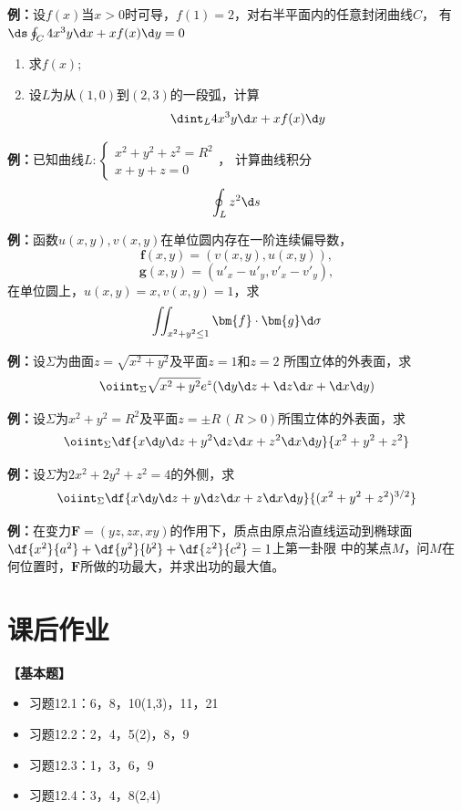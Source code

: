 {\bf 例：}设$f(x)$当$x>0$时可导，$f(1)=2$，对右半平面内的任意封闭曲线$C$，
有$\ds\oint_C4x^3y\d x+xf(x)\d y=0$
\begin{enumerate}[(1)]
  \setlength{\itemindent}{1cm}
  \item 求$f(x)$;
  \item 设$L$为从$(1,0)$到$(2,3)$的一段弧，计算
  $$\dint_L4x^3y\d x+xf(x)\d y$$
\end{enumerate}

{\bf 例：}已知曲线$L:\left\{\begin{array}{l}
	x^2+y^2+z^2=R^2\\ x+y+z=0
\end{array}\right.$，
计算曲线积分
$$\oint_Lz^2\d s$$

{\bf 例：}函数$u(x,y),v(x,y)$在单位圆内存在一阶连续偏导数，
$$\bm{f}(x,y)=(v(x,y),u(x,y)),$$
$$\bm{g}(x,y)=\left(u'_x-u'_y,v'_x-v'_y\right),$$
在单位圆上，$u(x,y)=x,v(x,y)=1$，求
$$\iint_{x^2+y^2\leq 1}\bm{f}\cdot\bm{g}\d\sigma$$

{\bf 例：}设$\Sigma$为曲面$z=\sqrt{x^2+y^2}$及平面$z=1$和$z=2$
所围立体的外表面，求
$$\oiint_{\Sigma}\sqrt{x^2+y^2}e^z(\d y\d z+\d z\d x+\d x\d y)$$

{\bf 例：}设$\Sigma$为$x^2+y^2=R^2$及平面$z=\pm R\,(R>0)$所围立体的外表面，求
$$\oiint_{\Sigma}\df{x\d y\d z+y^2\d z\d x+z^2\d x\d y}{x^2+y^2+z^2}$$

{\bf 例：}设$\Sigma$为$2x^2+2y^2+z^2=4$的外侧，求
$$\oiint_{\Sigma}\df{x\d y\d z+y\d z\d x+z\d x\d y}{(x^2+y^2+z^2)^{3/2}}$$

{\bf 例：}在变力$\bm{F}=(yz,zx,xy)$的作用下，质点由原点沿直线运动到椭球面
$\df{x^2}{a^2}+\df{y^2}{b^2}+\df{z^2}{c^2}=1$上第一卦限
中的某点$M$，问$M$在何位置时，$\bm{F}$所做的功最大，并求出功的最大值。

\newpage

\section*{课后作业}

{\bf 【基本题】}

\begin{itemize}
  \setlength{\itemindent}{1cm}
  \item 习题12.1：6，8，10(1,3)，11，21
  \item 习题12.2：2，4，5(2)，8，9
  \item 习题12.3：1，3，6，9
  \item 习题12.4：3，4，8(2,4)
\end{itemize}

